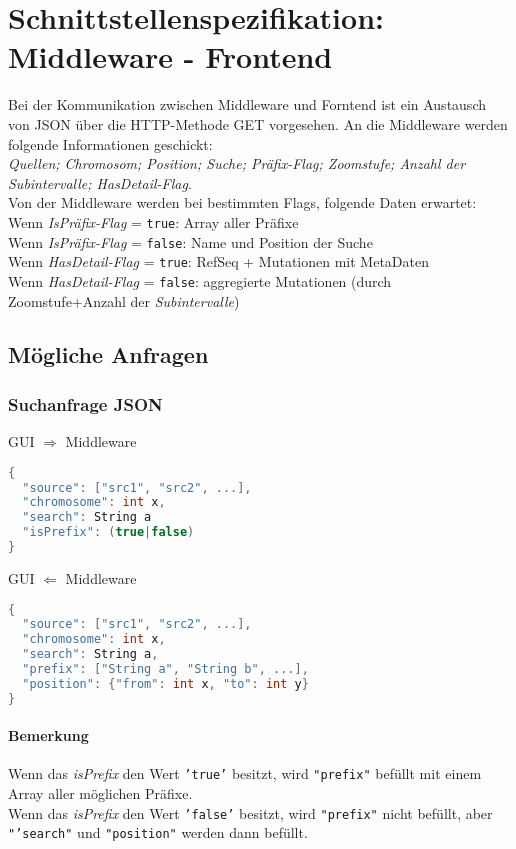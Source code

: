 \section{Schnittstellenspezifikation: Middleware - Frontend}
Bei der Kommunikation zwischen Middleware und Forntend ist ein Austausch von JSON über die HTTP-Methode GET vorgesehen.
An die Middleware werden folgende Informationen geschickt:
\\
\textit{Quellen; Chromosom; Position; Suche; Präfix-Flag; Zoomstufe; Anzahl der Subintervalle; HasDetail-Flag}.\\
Von der Middleware werden bei bestimmten Flags, folgende Daten erwartet:
\\
Wenn \textit{IsPräfix-Flag} = \texttt{true}: Array aller Präfixe\\
Wenn \textit{IsPräfix-Flag} = \texttt{false}: Name und Position der Suche\\[1em]
Wenn \textit{HasDetail-Flag} = \texttt{true}: RefSeq + Mutationen mit MetaDaten\\
Wenn \textit{HasDetail-Flag} = \texttt{false}: aggregierte Mutationen (durch Zoomstufe+Anzahl der \textit{Subintervalle})

\subsection{Mögliche Anfragen}
\subsubsection{Suchanfrage JSON}
GUI $\Rightarrow$ Middleware
\begin{lstlisting}[language=c,
commentstyle=\fontsize{12}{14.4}\ttfamily,
basicstyle=\ttfamily\fontsize{10}{12}\selectfont, showstringspaces=false]
{
  "source": ["src1", "src2", ...],
  "chromosome": int x,
  "search": String a
  "isPrefix": (true|false)
}
\end{lstlisting}
GUI $\Leftarrow$ Middleware
\begin{lstlisting}[language=c,
commentstyle=\fontsize{12}{14.4}\ttfamily,
basicstyle=\ttfamily\fontsize{10}{12}\selectfont, showstringspaces=false]
{
  "source": ["src1", "src2", ...],
  "chromosome": int x,
  "search": String a,
  "prefix": ["String a", "String b", ...],
  "position": {"from": int x, "to": int y}
}
\end{lstlisting}
\paragraph{Bemerkung} Wenn das \textit{isPrefix} den Wert \texttt{'true'} besitzt, wird \texttt{"prefix"} befüllt mit einem Array aller möglichen Präfixe.\\
Wenn das \textit{isPrefix} den Wert \texttt{'false'} besitzt, wird \texttt{"prefix"} nicht befüllt, aber \texttt{"'search"} und \texttt{"position"} werden dann befüllt.
\newpage

